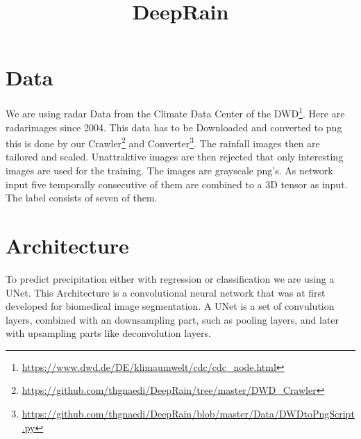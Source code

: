 \documentclass[oneside]{htwg-report}
\begin{document}



\newcommand{\verfasserA}{Thomas Gnädig}
\newcommand{\verfasserB}{Etienne Gramlich}
\newcommand{\verfasserC}{Merle Wolff}
\newcommand{\verfasserD}{Tim Hardenacke}
\newcommand{\verfasserE}{}
\newcommand{\thema}{DeepRain}
\newcommand{\hoschschule}{Hochschule für Technik, Wirtschaft und Gestaltung}
\newcommand{\institut}{HTWG Konstanz, Institut für Optische Systeme}
\newcommand{\prueferA}{Oliver Dürr}
\newcommand{\prueferB}{}


\title[Teamprojektthema]{\thema}


\makecover[]
%          
%


\twocolumn
\section*{Data}
We are using radar Data from the Climate Data Center of the DWD\footnote{\url{https://www.dwd.de/DE/klimaumwelt/cdc/cdc_node.html}}. Here are radarimages since 2004. 
This data has to be Downloaded and converted to png this is done by our Crawler\footnote{\url{https://github.com/thgnaedi/DeepRain/tree/master/DWD_Crawler}} and Converter\footnote{\url{https://github.com/thgnaedi/DeepRain/blob/master/Data/DWDtoPngScript.py}}.
The rainfall images then are tailored and scaled. Unattraktive images are then rejected that only interesting images are used for the training.
The images are grayscale png's. As network input five temporally consecutive of them are combined to a 3D tensor as input. The label consists of seven of them.

\section*{Architecture}
To predict precipitation either with regression or classification we are using a UNet.
This Architecture is a convolutional neural network that was at first developed for biomedical image segmentation.
A UNet is a set of convulution layers, combined with an downsampling part, such as pooling layers, and later with upsampling parts like deconvolution layers.
\end{document}
